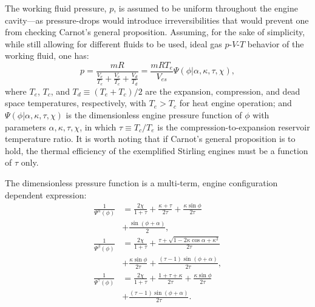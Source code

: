     The working fluid pressure, $p$, is assumed to be uniform throughout the engine  cavity---as
    pressure-drops would introduce  irreversibilities  that  would  prevent  one  from  checking
    Carnot's general proposition. Assuming, for the sake of simplicity, while still allowing for
    different fluids to be used, ideal gas $p$-$V$-$T$ behavior of the working fluid, one has:
    \begin{equation}
        \label{eq:P}
        p = \frac{mR}{\frac{V_e}{T_e} + \frac{V_c}{T_c} + \frac{V_d}{T_d}}
          = \frac{mRT_e}{V_{es}}\Psi(\phi | \alpha, \kappa, \tau, \chi),
    \end{equation}
    \noindent where $T_e$, $T_c$, and $T_d \equiv (T_e + T_c)/2$ are the expansion, compression,
    and dead space temperatures, respectively, with $T_e > T_c$ for heat engine  operation;  and
    $\Psi(\phi | \alpha, \kappa, \tau, \chi)$ is the dimensionless engine pressure  function  of
    $\phi$ with parameters $\alpha, \kappa, \tau, \chi$, in which $\tau \equiv T_c / T_e$ is the
    compression-to-expansion reservoir temperature ratio. It is worth noting  that  if  Carnot's
    general proposition is to hold, the thermal efficiency of the exemplified  Stirling  engines
    must be a function of $\tau$ only.

    The  dimensionless  pressure  function  is  a  multi-term,  engine   configuration dependent
    expression:
    \begin{align}
        \label{eq:Psia}
        \frac{1}{\Psi^{\alpha}(\phi)} &=
                \frac{2\chi}{1 + \tau} +
                \frac{\kappa + \tau}{2\tau} +
                \frac{\kappa\sin\phi}{2\tau} \nonumber\\
            &+  \frac{\sin(\phi + \alpha)}{2},\\
        \label{eq:Psib}
        \frac{1}{\Psi^{\beta}(\phi)}  &=
                \frac{2\chi}{1 + \tau} +
                \frac{\tau + \sqrt{1 - 2\kappa\cos\alpha + \kappa^2}}{2\tau} \nonumber\\
            &+  \frac{\kappa\sin\phi}{2\tau} +
                \frac{(\tau - 1)\sin(\phi + \alpha)}{2\tau},\\
        \label{eq:Psig}
        \frac{1}{\Psi^{\gamma}(\phi)} &=
                \frac{2\chi}{1 + \tau} +
                \frac{1 + \tau + \kappa}{2\tau} +
                \frac{\kappa\sin\phi}{2\tau} \nonumber\\
            &+  \frac{(\tau - 1)\sin(\phi + \alpha)}{2\tau}.
    \end{align}

